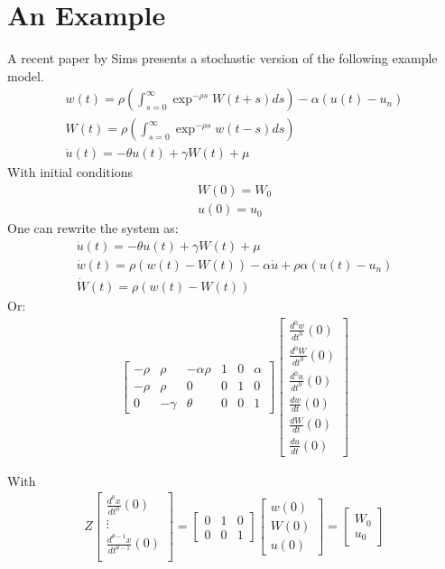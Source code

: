 \documentclass[1p]{elsarticle}
\begin{document}
\section{An Example}
A recent paper by Sims\cite{sims96} presents a stochastic version of
the following  example model.
\begin{gather*}
  w(t) =  \rho \left ( \int_{s=0}^\infty \exp^{-\rho s}W(t+s) ds \right ) - \alpha (u(t) -u_n)\\
W(t) = \rho \left ( \int_{s=0}^\infty \exp^{-\rho s}w(t-s) ds \right )\\
\dot{u}(t) = -\theta u(t) + \gamma W(t) + \mu
\end{gather*}
With initial conditions 
\begin{gather*}
  W(0)=W_0\\u(0)=u_0
\end{gather*}
One can rewrite the system as:
\begin{gather*}
\dot{u}(t) = -\theta u(t) + \gamma W(t) + \mu\\
\dot{w}(t) = \rho (w(t) - W(t) ) - \alpha \dot{u} +\rho \alpha(u(t) - u_n)\\
\dot{W}(t) = \rho(w(t) - W(t))
\end{gather*}
Or:
\begin{gather*}
  \begin{bmatrix}
    -\rho&\rho&-  \alpha \rho  &1&0&\alpha\\
  -\rho&\rho&0&0&1&0 \\
 0&-\gamma&\theta&0&0&1 
  \end{bmatrix}  \begin{bmatrix}
    \frac{d^0w}{dt^0}(0)\\
    \frac{d^0W}{dt^0}(0)\\
    \frac{d^0u}{dt^0}(0)\\
    \frac{dw}{dt}(0)\\
    \frac{dW}{dt}(0)\\
    \frac{du}{dt}(0)
  \end{bmatrix}
\end{gather*}

With
\begin{gather*}
  Z 
  \begin{bmatrix}
    \frac{d^0x}{dt^0}(0)\\
\vdots\\
    \frac{d^{\theta-1}x}{dt^{\theta-1}}(0)\\
  \end{bmatrix}= 
  \begin{bmatrix}
    0&1&0\\0&0&1
  \end{bmatrix} 
\begin{bmatrix}
w(0)\\W(0)\\u(0)
\end{bmatrix}= 
\begin{bmatrix}
  W_0\\u_0
\end{bmatrix}
\end{gather*}


%




\nocite{sims96}
\nocite{berry}
\nocite{golub89}
\nocite{blanchard80}
\nocite{krishnamurthy89}





\end{document}
